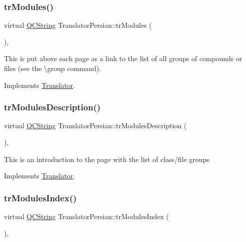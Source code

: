 \subsubsection{\texorpdfstring{trModules()}{trModules()}}
{\footnotesize\ttfamily virtual \mbox{\hyperlink{class_q_c_string}{Q\+C\+String}} Translator\+Persian\+::tr\+Modules (\begin{DoxyParamCaption}{ }\end{DoxyParamCaption})\hspace{0.3cm}{\ttfamily [inline]}, {\ttfamily [virtual]}}

This is put above each page as a link to the list of all groups of compounds or files (see the \textbackslash{}group command). 

Implements \mbox{\hyperlink{class_translator}{Translator}}.

\mbox{\label{class_translator_persian_a6753fd1c637d103053fa6c0d525ed4e3}} 
\subsubsection{\texorpdfstring{trModulesDescription()}{trModulesDescription()}}
{\footnotesize\ttfamily virtual \mbox{\hyperlink{class_q_c_string}{Q\+C\+String}} Translator\+Persian\+::tr\+Modules\+Description (\begin{DoxyParamCaption}{ }\end{DoxyParamCaption})\hspace{0.3cm}{\ttfamily [inline]}, {\ttfamily [virtual]}}

This is an introduction to the page with the list of class/file groups 

Implements \mbox{\hyperlink{class_translator}{Translator}}.

\mbox{\label{class_translator_persian_a01a3063763784bf67b21bad282c8a914}} 
\subsubsection{\texorpdfstring{trModulesIndex()}{trModulesIndex()}}
{\footnotesize\ttfamily virtual \mbox{\hyperlink{class_q_c_string}{Q\+C\+String}} Translator\+Persian\+::tr\+Modules\+Index (\begin{DoxyParamCaption}{ }\end{DoxyParamCaption})\hspace{0.3cm}{\ttfamily [inline]}, {\ttfamily [virtual]}}

